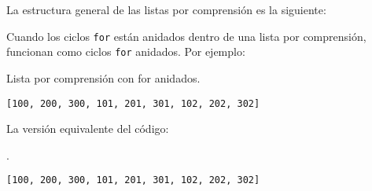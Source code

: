La estructura general de las listas por comprensión es la siguiente:

\begin{Shaded}
\begin{Highlighting}[]
\NormalTok{    [}
\NormalTok{ iterable1 [}\NormalTok{ condition1]}
                   \NormalTok{ iterable2 [}\NormalTok{ condition2]}
                   \NormalTok{ iterableN [}\NormalTok{ conditionN]}
\NormalTok{    ]}
\end{Highlighting}
\end{Shaded}

Cuando los ciclos \texttt{for} están anidados dentro de una lista por
comprensión, funcionan como ciclos \texttt{for} anidados. Por ejemplo:\\

\begin{code} Lista por comprensión con for anidados.

\begin{Shaded}
\begin{Highlighting}[]
\OperatorTok{=}\NormalTok{ [x}\OperatorTok{+}\NormalTok{ [}\NormalTok{, }\NormalTok{, }\NormalTok{] }\NormalTok{ [}\NormalTok{, }\NormalTok{, }\NormalTok{]]}
\end{Highlighting}
\end{Shaded}

\begin{verbatim}
[100, 200, 300, 101, 201, 301, 102, 202, 302]
\end{verbatim}
\end{code}

La versión equivalente del código: \\

\begin{code} .

\begin{Shaded}
\begin{Highlighting}[]
\OperatorTok{=}\NormalTok{ []}
\NormalTok{ [}\NormalTok{, }\NormalTok{, }\NormalTok{]:}
    \NormalTok{ [}\NormalTok{, }\NormalTok{, }\NormalTok{]:}
\OperatorTok{+}

\end{Highlighting}
\end{Shaded}

\begin{verbatim}
[100, 200, 300, 101, 201, 301, 102, 202, 302]
\end{verbatim}
\end{code}

